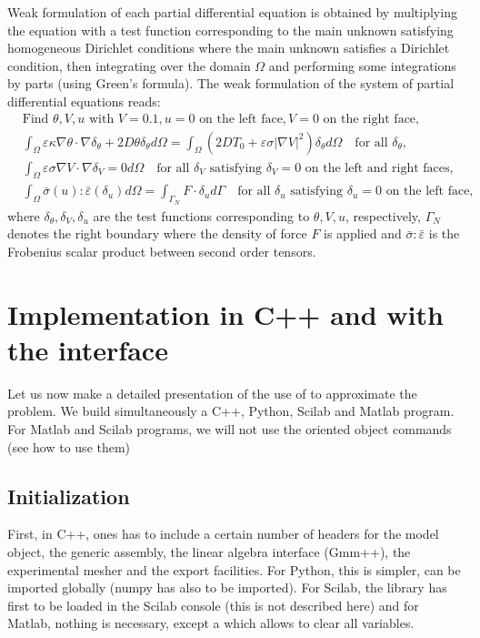 \documentclass[a4paper,11pt,english]{sphinxmanual}
\begin{document}
Weak formulation of each partial differential equation is obtained by multiplying the equation with a test function corresponding to the main unknown satisfying homogeneous Dirichlet conditions where the main unknown satisfies a Dirichlet condition, then integrating over the domain \(\Omega\) and performing some integrations by parts (using Green’s formula). The weak formulation of the system of partial differential equations reads:
\begin{equation*}
\begin{split}&\mbox{Find } \theta, V, u \mbox{ with } V = 0.1, u = 0 \mbox{ on the left face}, V = 0 \mbox{ on the right face}, \\
& \int_{\Omega} \varepsilon\kappa\nabla\theta\cdot\nabla\delta_{\theta} + 2D\theta\delta_{\theta}d\Omega = \int_{\Omega} (2DT_0 + \varepsilon\sigma|\nabla V|^2)\delta_{\theta} d\Omega ~~~\mbox{ for all } \delta_{\theta}, \\
& \int_{\Omega} \varepsilon\sigma\nabla V\cdot\nabla\delta_V = 0 d\Omega ~~~ \mbox{ for all } \delta_V \mbox{ satisfying } \delta_V = 0 \mbox{ on the left and right faces}, \\
& \int_{\Omega} \bar{\sigma}(u):\bar{\varepsilon}(\delta_u)d\Omega = \int_{\Gamma_N} F\cdot \delta_u d\Gamma ~~~ \mbox{ for all } \delta_{u} \mbox{ satisfying } \delta_u = 0 \mbox{ on the left face},\end{split}
\end{equation*}
where \(\delta_{\theta}, \delta_V, \delta_u\) are the test functions corresponding to \(\theta, V, u\), respectively, \(\Gamma_N\) denotes the right boundary where the density of force \(F\) is applied and \(\bar{\sigma}:\bar{\varepsilon}\) is the Frobenius scalar product between second order tensors.


\section{Implementation in C++ and with the interface}
\label{\detokenize{tutorial/thermo_coupling:implementation-in-c-and-with-the-interface}}
Let us now make a detailed presentation of the use of  to approximate the problem. We build simultaneously a C++, Python, Scilab and Matlab program. For Matlab and Scilab programs, we will not use the oriented object commands (see  how to use them)


\subsection{Initialization}
\label{\detokenize{tutorial/thermo_coupling:initialization}}
First, in C++, ones has to include a certain number of headers for the model object, the generic assembly, the linear algebra interface (Gmm++), the experimental mesher and the export facilities. For Python, this is simpler,  can be imported globally (numpy has also to be imported). For Scilab, the library has first to be loaded in the Scilab console (this is not described here) and for Matlab, nothing is necessary, except a  which allows to clear all  variables.
\end{document}
